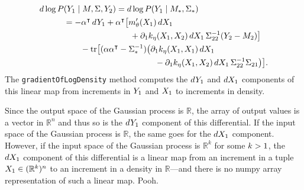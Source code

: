 \documentclass{article}
\newcommand{\Mu}{M}
\newcommand{\R}{\mathbb{R}}
\newcommand{\T}{\intercal}
\newcommand{\code}[1]{\texttt{#1}}
\newcommand{\given}{\mathrel{|}}
\newcommand{\n}[1]{\text{\rm #1}}
\newcommand{\one}{\n1}
\newcommand{\two}{\n2}
\DeclareMathOperator{\tr}{tr}
\begin{document}
\begin{align}
  d \log P&(Y_\one \given \Mu, \Sigma, Y_\two)
    = d \log P(Y_\one \given \Mu_*, \Sigma_*) \nonumber\\
   &= -\alpha^\T\,dY_\one
      + \alpha^\T \bigl[
          m_\theta'(X_\one)\,dX_\one \\
   &\quad\quad\quad\quad\quad\quad\quad\quad
          + \partial_\one k_\eta(X_\one, X_\two)\,dX_\one
            \,\Sigma_{\two\two}^{-\one} (Y_\two - \Mu_\two)
        \bigr] \nonumber\\
   &\quad\quad
      - \tr\bigl[
          (\alpha \alpha^\T - \Sigma_*^{-\one})
          \bigl(
            \partial_\one k_\eta(X_\one, X_\one)\,dX_\one \nonumber\\
   &\quad\quad\quad\quad\quad\quad\quad\quad\quad\quad\quad
            - \partial_\one k_\eta(X_\one, X_\two)\,dX_\one
              \,\Sigma_{\two\two}^{-\one} \Sigma_{\two\one}
          \bigr)
        \bigr]. \nonumber
\end{align}
%
The \code{gradientOfLogDensity} method computes the $dY_\one$ and
 $dX_\one$ components of this linear map from increments in $Y_\one$
 and $X_\one$ to increments in density.

Since the output space of the Gaussian process is $\R$, the array of
 output values is a vector in $\R^n$ and thus so is the $dY_\one$
 component of this differential.
If the input space of the Gaussian process is $\R$, the same goes for
 the $dX_\one$ component.
However, if the input space of the Gaussian process is $\R^k$ for some
 $k > \one$, the $dX_\one$ component of this differential is a linear
 map from an increment in a tuple $X_\one \in (\R^k)^n$ to an increment
 in a density in $\R$---and there is no numpy array representation of
 such a linear map.
Pooh.
\end{document}
